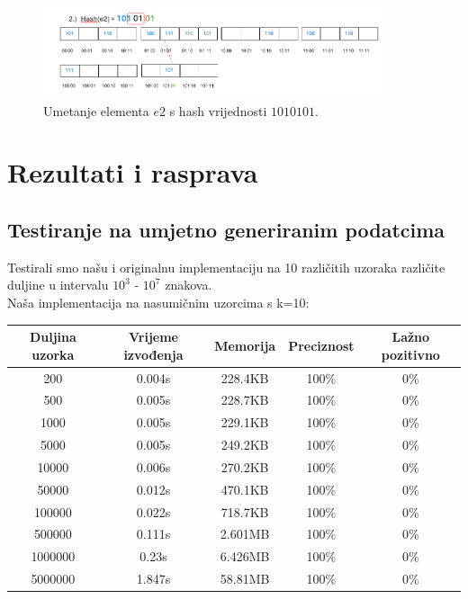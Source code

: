 \documentclass[seminarskirad]{fer}
\begin{document}
	\begin{figure}[h]
		\centering
		\includegraphics[width=0.9\textwidth]{images/umetanje_el2.png}
		\caption{Umetanje elementa \( e2 \) s hash vrijednosti \( 1010101 \).}
		\label{fig:insertion_e2}
	\end{figure}
	

\chapter{Rezultati i rasprava}
\label{pog:rezultati_i_rasprava}

\section{Testiranje na umjetno generiranim podatcima}
Testirali smo našu i originalnu implementaciju na 10 različitih uzoraka različite duljine u intervalu \(10^3\) - \(10^7\) znakova. \\


Naša implementacija na nasumičnim uzorcima s k=10:
\begin{center}
	\small
	\begin{tabular}{||c c c c c||} 
		\hline
		Duljina uzorka & Vrijeme izvođenja & Memorija & Preciznost & Lažno pozitivno \\ [0.5ex] 
		\hline\hline
		200 & 0.004s & 228.4KB & 100\% & 0\% \\ 
		\hline
		500 & 0.005s & 228.7KB & 100\% & 0\% \\
		\hline
		1000 & 0.005s & 229.1KB & 100\% & 0\% \\
		\hline
		5000 & 0.005s & 249.2KB & 100\% & 0\% \\
		\hline
		10000 & 0.006s & 270.2KB & 100\% & 0\% \\
		\hline
		50000 & 0.012s & 470.1KB & 100\% & 0\% \\ 
		\hline
		100000 & 0.022s & 718.7KB & 100\% & 0\% \\
		\hline
		500000 & 0.111s & 2.601MB & 100\% & 0\% \\
		\hline
		1000000 & 0.23s & 6.426MB & 100\% & 0\% \\
		\hline
		5000000 & 1.847s & 58.81MB & 100\% & 0\% \\ [1ex] 
		\hline
	\end{tabular}
\end{center}
\end{document}
